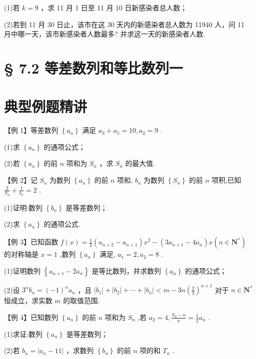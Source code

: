 (1)若 $k = 9$ ，求 11 月 1 日至 11 月 10 日新感染者总人数；

(2)若到 11 月 30 日止，该市在这 30 天内的新感染者总人数为 11940 人，问 11 月中哪一天，该市新感染者人数最多? 并求这一天的新感染者人数.

\section*{§ 7.2 等差数列和等比数列一}

\section*{典型例题精讲}

【例 1】等差数列 $\left\{  {a}_{n}\right\}$ 满足 ${a}_{3} + {a}_{5} = {10},{a}_{2} = 9$ .

(1)求 $\left\{  {a}_{n}\right\}$ 的通项公式；

(2)若 $\left\{  {a}_{n}\right\}$ 的前 $n$ 项和为 ${S}_{n}$ ，求 ${S}_{n}$ 的最大值.

【例 2】记 ${S}_{n}$ 为数列 $\left\{  {a}_{n}\right\}$ 的前 $n$ 项和, ${b}_{n}$ 为数列 $\left\{  {S}_{n}\right\}$ 的前 $n$ 项积,已知 $\frac{2}{{S}_{n}} + \frac{1}{{b}_{n}} = 2$ .

(1)证明:数列 $\left\{  {b}_{n}\right\}$ 是等差数列；

(2)求 $\left\{  {a}_{n}\right\}$ 的通项公式.

【例 3】已知函数 $f\left( x\right)  = \frac{1}{2}\left( {{a}_{n + 2} - {a}_{n + 1}}\right) {x}^{2} - \left( {3{a}_{n + 1} - 4{a}_{n}}\right) x\left( {n \in  {\mathbf{N}}^{ * }}\right)$ 的对称轴是 $x = 1$ ,数列 $\left\{  {a}_{n}\right\}$ 满足, ${a}_{1} = 2,{a}_{2} = 8$ .

(1)证明数列 $\left\{  {{a}_{n + 1} - 2{a}_{n}}\right\}$ 是等比数列，并求数列 $\left\{  {a}_{n}\right\}$ 的通项公式；

(2)设 ${3}^{n}{b}_{n} = {\left( -1\right) }^{n}{a}_{n}$ ，且 $\left| {b}_{1}\right|  + \left| {b}_{2}\right|  + \cdots  + \left| {b}_{n}\right|  < m - {3n}{\left( \frac{2}{3}\right) }^{n + 1}$ 对于 $n \in  {\mathbf{N}}^{ * }$ 恒成立，求实数 $m$ 的取值范围.

【例 4】已知数列 $\left\{  {a}_{n}\right\}$ 的前 $n$ 项和为 ${S}_{n}$ ,若 ${a}_{2} = 4,\frac{{S}_{n} - n}{n} = \frac{1}{2}{a}_{n}$ .

(1)求证:数列 $\left\{  {a}_{n}\right\}$ 是等差数列；

(2)若 ${b}_{n} = \left| {{a}_{n} - {11}}\right|$ ，求数列 $\left\{  {b}_{n}\right\}$ 的前 $n$ 项的和 ${T}_{n}$ .

